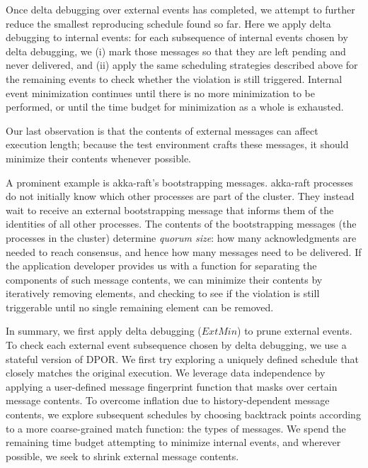  Once delta debugging over external
events has completed,
we attempt to further reduce the smallest reproducing schedule found so far.
Here we apply delta debugging to internal events: for each subsequence of
internal events chosen by delta debugging, we (i) mark those messages so that they
are left pending and never delivered, and (ii) apply the same scheduling
strategies described above for the remaining events to check whether the
violation is still triggered.
Internal event minimization continues until there is no more minimization to
be performed, or until the time budget for minimization as a whole is exhausted.

 Our last observation is that the contents of external messages
can affect execution length; because the test environment crafts these
messages, it should minimize their contents whenever
possible.

A prominent example is akka-raft's bootstrapping messages. akka-raft
processes do not initially know which other processes are part of the cluster.
They instead wait to receive an external bootstrapping message that informs
them of the identities of all other processes. The contents of the bootstrapping
messages (the processes in the cluster) determine {\em quorum
size}: how many acknowledgments are needed to reach consensus, and hence
how many messages need to be delivered. If the application developer
provides us with a function for separating the components of such message
contents, we can minimize their
contents by iteratively removing elements, and checking to see if the violation is still triggerable until
no single remaining element can be removed.

 In summary, we first apply delta debugging ($ExtMin$) to prune external events.
To check each external event subsequence chosen by delta debugging, we use a stateful version of DPOR.
We first try exploring a uniquely defined schedule that closely matches the original execution.
We leverage data independence by applying a
user-defined message fingerprint function that masks over certain message
contents. To overcome inflation due to
history-dependent message contents, we explore subsequent schedules by
choosing backtrack points according to a more coarse-grained match function: the
types of messages. We spend the remaining time budget attempting to minimize internal events, and wherever
possible, we seek to shrink external message contents.

